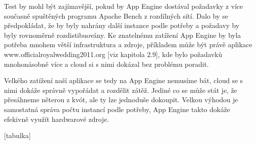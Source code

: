 Test by mohl být zajímavější, pokud by App Engine dostával požadavky z více současně spuštěných programu Apache Bench z rozdílných sítí. Dalo by se předpokládat, že by byly nahrány další instance podle potřeby a požadavy by byly rovnoměrně rozdistibuovány. Ke znatelnému zatížení App Engine by byla potřeba mnohem větší infrastruktura a zdroje, příkladem může být právě aplikace www.officialroyalwedding2011.org [viz kapitola 2.9], kde bylo požadavků mnohonásobně více a cloud si s nimi dokázal bez problému poradit.

Velkého zatížení naší aplikace se tedy na App Engine nemusíme bát, cloud se s nimi dokáže správně vypořádat a rozdělit zátěž. Jediné co se může stát je, že přesáhneme něterou z kvót, ale ty lze jednoduše dokoupit. Velkou výhodou je samostatná správa počtu instancí podle potřeby, App Engine takto dokáže efekivně využít hardwarové zdroje.

[tabulka]
